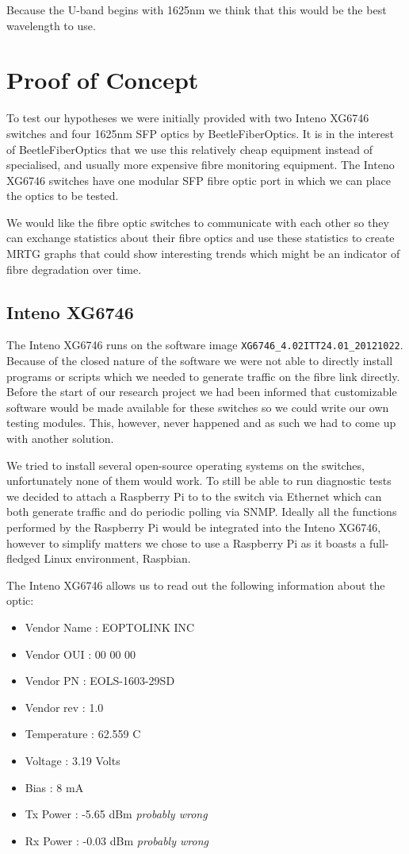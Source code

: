 \documentclass{article}
\begin{document}
Because the U-band begins with 1625nm we think that this would be the best wavelength to use.

\newpage
\section{Proof of Concept}
To test our hypotheses we were initially provided with two Inteno XG6746\cite{Inteno:XG6746} switches and four 1625nm SFP optics by BeetleFiberOptics.
It is in the interest of BeetleFiberOptics that we use this relatively cheap equipment instead of specialised, and usually more expensive fibre monitoring equipment.
The Inteno XG6746 switches have one modular SFP fibre optic port in which we can place the optics to be tested. 

We would like the fibre optic switches to communicate with each other so they can exchange statistics about their fibre optics and use these statistics to create MRTG\cite{MRTG:MRTG} graphs that could show interesting trends which might be an indicator of fibre degradation over time.

\subsection{Inteno XG6746}
The Inteno XG6746 runs on the software image \texttt{XG6746\_4.02ITT24.01\_20121022}.
Because of the closed nature of the software we were not able to directly install programs or scripts which we needed to generate traffic on the fibre link directly.
Before the start of our research project we had been informed that customizable software would be made available for these switches so we could write our own testing modules.
This, however, never happened and as such we had to come up with another solution.

We tried to install several open-source operating systems on the switches, unfortunately none of them would work. To still be able to run diagnostic tests we decided to attach a Raspberry Pi to to the switch via Ethernet which can both generate traffic and do periodic polling via SNMP.
Ideally all the functions performed by the Raspberry Pi would be integrated into the Inteno XG6746, however to simplify matters we chose to use a Raspberry Pi as it boasts a full-fledged Linux environment, Raspbian\cite{raspbian:raspbian}.

The Inteno XG6746 allows us to read out the following information about the optic:
\begin{itemize}
	\item Vendor Name : EOPTOLINK INC   
	\item Vendor OUI  : 00 00 00
	\item Vendor PN   : EOLS-1603-29SD  
	\item Vendor rev  : 1.0 
	\item Temperature : 62.559 C
	\item Voltage     : 3.19 Volts
	\item Bias        : 8 mA
	\item Tx Power    : -5.65 dBm \emph{probably wrong}
	\item Rx Power    : -0.03 dBm \emph{probably wrong}
\end{itemize}
\end{document}
